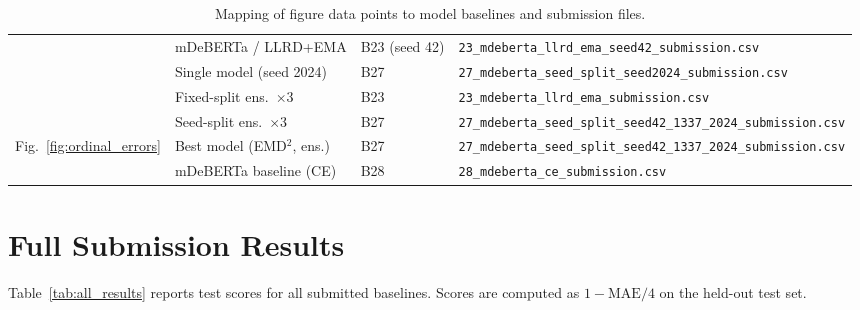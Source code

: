 \documentclass{article}
\begin{document}
\begin{table}[H]
\begin{tabular}{llll}
  & mDeBERTa / LLRD+EMA          & B23 (seed 42) & \texttt{23\_mdeberta\_llrd\_ema\_seed42\_submission.csv} \\
  & Single model (seed 2024)     & B27 & \texttt{27\_mdeberta\_seed\_split\_seed2024\_submission.csv} \\
  & Fixed-split ens.\ $\times$3  & B23 & \texttt{23\_mdeberta\_llrd\_ema\_submission.csv} \\
  & Seed-split ens.\ $\times$3   & B27 & \texttt{27\_mdeberta\_seed\_split\_seed42\_1337\_2024\_submission.csv} \\
\midrule
\multirow{2}{*}{Fig.~\ref{fig:ordinal_errors}}
  & Best model (EMD$^2$, ens.)   & B27 & \texttt{27\_mdeberta\_seed\_split\_seed42\_1337\_2024\_submission.csv} \\
  & mDeBERTa baseline (CE)       & B28 & \texttt{28\_mdeberta\_ce\_submission.csv} \\
\bottomrule
\end{tabular}
\caption{Mapping of figure data points to model baselines and submission files.}
\label{tab:submission_index}
\end{table}

\FloatBarrier
\section{Full Submission Results}
\label{app:results}

Table~\ref{tab:all_results} reports test scores for all submitted baselines.
Scores are computed as $1 - \text{MAE}/4$ on the held-out test set.
\end{document}
